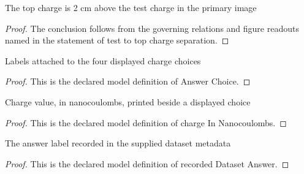 \begin{lemma}
  \label{lem:physics:phyx-mini-0899:phyxminiproblems-problemphyxmini0899-test-to-top-charge-separation}
  The top charge is 2 cm above the test charge in the primary image
\end{lemma}
\begin{proof}
  The conclusion follows from the governing relations and figure readouts named in the statement of test to top charge separation.
\end{proof}
\begin{definition}
  \label{def:physics:phyx-mini-0899:phyxminiproblems-problemphyxmini0899-answerchoice}
  Labels attached to the four displayed charge choices
\end{definition}
\begin{proof}
  This is the declared model definition of Answer Choice.
\end{proof}
\begin{definition}
  \label{def:physics:phyx-mini-0899:phyxminiproblems-problemphyxmini0899-answerchoice-chargeinnanocoulombs}
  Charge value, in nanocoulombs, printed beside a displayed choice
\end{definition}
\begin{proof}
  This is the declared model definition of charge In Nanocoulombs.
\end{proof}
\begin{definition}
  \label{def:physics:phyx-mini-0899:phyxminiproblems-problemphyxmini0899-recordeddatasetanswer}
  The answer label recorded in the supplied dataset metadata
\end{definition}
\begin{proof}
  This is the declared model definition of recorded Dataset Answer.
\end{proof}
